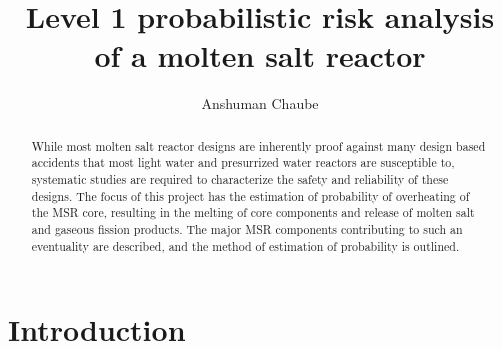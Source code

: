 \documentclass[12pt]{article}
\begin{document}
\title{Level 1 probabilistic risk analysis of a molten salt reactor}

\author{Anshuman Chaube}%

\date{}

\maketitle

\begin{abstract}
While most molten salt reactor designs are inherently proof against many design based accidents that most light water and presurrized water reactors are susceptible to, systematic studies are required to characterize the safety and reliability of these designs. The focus of this project has the estimation of probability of overheating of the MSR core, resulting in the melting of core components and release of molten salt and gaseous fission products. The major MSR components contributing to such an eventuality are described, and the method of estimation of probability is outlined.
\end{abstract}

\section{Introduction}
\end{document}
